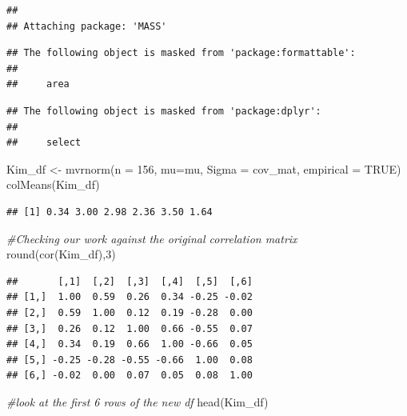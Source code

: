 \documentclass[
  11pt,
]{book}
\newenvironment{Shaded}{\begin{snugshade}}{\end{snugshade}}
\newcommand{\AttributeTok}[1]{\textcolor[rgb]{0.77,0.63,0.00}{#1}}
\newcommand{\CommentTok}[1]{\textcolor[rgb]{0.56,0.35,0.01}{\textit{#1}}}
\newcommand{\ConstantTok}[1]{\textcolor[rgb]{0.00,0.00,0.00}{#1}}
\newcommand{\DecValTok}[1]{\textcolor[rgb]{0.00,0.00,0.81}{#1}}
\newcommand{\FunctionTok}[1]{\textcolor[rgb]{0.00,0.00,0.00}{#1}}
\newcommand{\NormalTok}[1]{#1}
\newcommand{\OtherTok}[1]{\textcolor[rgb]{0.56,0.35,0.01}{#1}}
\begin{document}
\begin{verbatim}
## 
## Attaching package: 'MASS'
\end{verbatim}

\begin{verbatim}
## The following object is masked from 'package:formattable':
## 
##     area
\end{verbatim}

\begin{verbatim}
## The following object is masked from 'package:dplyr':
## 
##     select
\end{verbatim}

\begin{Shaded}
\begin{Highlighting}[]
\NormalTok{Kim\_df }\OtherTok{\textless{}{-}} \FunctionTok{mvrnorm}\NormalTok{(}\AttributeTok{n =} \DecValTok{156}\NormalTok{, }\AttributeTok{mu=}\NormalTok{mu, }\AttributeTok{Sigma =}\NormalTok{ cov\_mat, }\AttributeTok{empirical =} \ConstantTok{TRUE}\NormalTok{)}
\FunctionTok{colMeans}\NormalTok{(Kim\_df)}
\end{Highlighting}
\end{Shaded}

\begin{verbatim}
## [1] 0.34 3.00 2.98 2.36 3.50 1.64
\end{verbatim}

\begin{Shaded}
\begin{Highlighting}[]
\CommentTok{\#Checking our work against the original correlation matrix}
\FunctionTok{round}\NormalTok{(}\FunctionTok{cor}\NormalTok{(Kim\_df),}\DecValTok{3}\NormalTok{)}
\end{Highlighting}
\end{Shaded}

\begin{verbatim}
##       [,1]  [,2]  [,3]  [,4]  [,5]  [,6]
## [1,]  1.00  0.59  0.26  0.34 -0.25 -0.02
## [2,]  0.59  1.00  0.12  0.19 -0.28  0.00
## [3,]  0.26  0.12  1.00  0.66 -0.55  0.07
## [4,]  0.34  0.19  0.66  1.00 -0.66  0.05
## [5,] -0.25 -0.28 -0.55 -0.66  1.00  0.08
## [6,] -0.02  0.00  0.07  0.05  0.08  1.00
\end{verbatim}

\begin{Shaded}
\begin{Highlighting}[]
\CommentTok{\#look at the first 6 rows of the new df}
\FunctionTok{head}\NormalTok{(Kim\_df)}
\end{Highlighting}
\end{Shaded}
\end{document}
